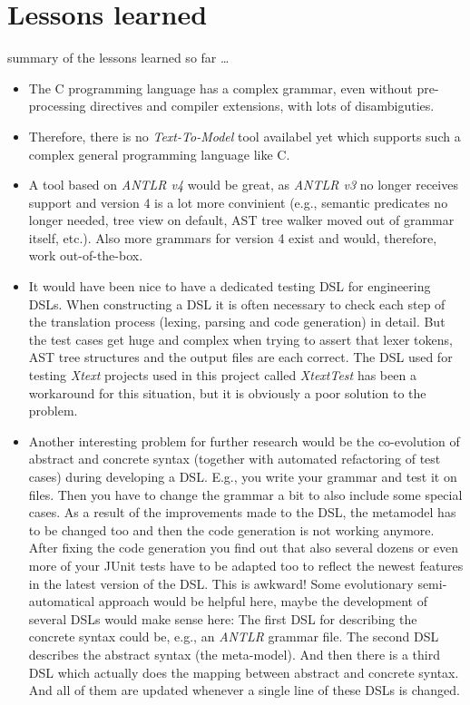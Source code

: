 \section{Lessons learned}
 summary of the lessons learned so far \dots

\begin{itemize}
 \item The C programming language has a complex grammar,
 even without pre-processing directives and compiler
 extensions, with lots of disambiguties.
 \item Therefore, there is no {\it Text-To-Model} tool
 availabel yet which supports such a
 complex general programming 
 language like C.
 \item A tool based on {\it ANTLR v4} would be great,
 as {\it ANTLR v3} no longer receives support and
 version 4 is a lot more convinient
 (e.g., semantic predicates no longer needed,
 tree view on default, AST tree walker moved out of
 grammar itself, etc.). Also more grammars
 for version 4 exist and would, therefore, 
 work out-of-the-box.
 \item It would have been nice to have a dedicated
 testing DSL for engineering DSLs. When constructing
 a DSL it is often necessary to check each step of
 the translation process (lexing, parsing and 
 code generation) in detail.
 But the test cases get huge and complex
 when trying to assert 
 that
 lexer tokens, AST tree structures and the output
 files are each correct.
 The DSL used for testing {\it Xtext} projects
 used in this project called {\it XtextTest} has been
 a workaround for this situation, but it is obviously 
 a poor solution to the problem.
 \item Another interesting problem for further research
 would be the co-evolution of abstract and concrete syntax
 (together with automated refactoring of test cases)
 during developing a DSL. E.g., you write your grammar and
 test it on files. Then you have to change the grammar a bit
 to also include some special cases. 
 As a result of the improvements made to the DSL,
 the metamodel has to be changed too and then the code
 generation is not working anymore.
 After fixing the code generation you find out that
 also several dozens or even more of your JUnit tests 
 have to be adapted too to reflect the newest features 
 in the latest version of the DSL.
 This is awkward! Some evolutionary semi-automatical 
 approach would be helpful here, maybe 
 the development of
 several DSLs would
 make sense here: The first DSL for describing the
 concrete syntax could be, e.g., an {\it ANTLR} grammar file.
 The second DSL describes the abstract syntax (the meta-model).
 And then there is a third DSL which actually does the 
 mapping between abstract and concrete syntax. And all of
 them are updated whenever a single line of these DSLs is 
 changed.
\end{itemize}

